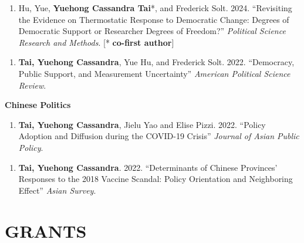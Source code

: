 \documentclass[10.5pt,]{article}
\providecommand{\tightlist}{%
	\setlength{\itemsep}{0pt}\setlength{\parskip}{0pt}}
\renewenvironment{itemize}{
	\begin{list}{}{
			\setlength{\leftmargin}{1.5em}
		}
	}{
	\end{list}
}
\begin{document}
\begin{itemize}
\begin{itemize}
\begin{enumerate}
    \end{enumerate}
  \item
    \begin{enumerate}
    \def\labelenumi{\arabic{enumi}.}
    \setcounter{enumi}{3}
    \tightlist
    \item
      Hu, Yue, \textbf{Yuehong Cassandra Tai}*, and Frederick Solt.
      2024. ``Revisiting the Evidence on Thermostatic Response to
      Democratic Change: Degrees of Democratic Support or Researcher
      Degrees of Freedom?'' \emph{Political Science Research and
      Methods}. {[}* \textbf{co-first author}{]}
    \end{enumerate}
  \item
    \begin{enumerate}
    \def\labelenumi{\arabic{enumi}.}
    \setcounter{enumi}{2}
    \tightlist
    \item
      \textbf{Tai, Yuehong Cassandra}, Yue Hu, and Frederick Solt. 2022.
      ``Democracy, Public Support, and Measurement Uncertainty''
      \emph{American Political Science Review}.
    \end{enumerate}
  \end{itemize}
\item
  \textbf{Chinese Politics}

  \begin{itemize}
  \tightlist
  \item
    \begin{enumerate}
    \def\labelenumi{\arabic{enumi}.}
    \setcounter{enumi}{1}
    \tightlist
    \item
      \textbf{Tai, Yuehong Cassandra}, Jielu Yao and Elise Pizzi. 2022.
      ``Policy Adoption and Diffusion during the COVID-19 Crisis''
      \emph{Journal of Asian Public Policy}.
    \end{enumerate}
  \item
    \begin{enumerate}
    \def\labelenumi{\arabic{enumi}.}
    \tightlist
    \item
      \textbf{Tai, Yuehong Cassandra}. 2022. ``Determinants of Chinese
      Provinces' Responses to the 2018 Vaccine Scandal: Policy
      Orientation and Neighboring Effect'' \emph{Asian Survey}.
    \end{enumerate}
  \end{itemize}
\end{itemize}

\section{GRANTS}\label{grants}
\end{document}

